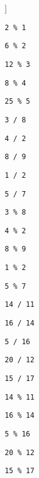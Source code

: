 \begin{exercise}
\begin{sltasks}[counter-format=1.tsk[1]]
\begin{items}
        \item \texttt{2 \% 1}
        \item \texttt{6 \% 2}
        \item \texttt{12 \% 3}
        \item \texttt{8 \% 4}
        \item \texttt{25 \% 5}
    \end{items}
    \task
    \begin{items}
        \item \texttt{3 / 8}
        \item \texttt{4 / 2}
        \item \texttt{8 / 9}
        \item \texttt{1 / 2}
        \item \texttt{5 / 7}
    \end{items}
    \task
    \begin{items}
        \item \texttt{3 \% 8}
        \item \texttt{4 \% 2}
        \item \texttt{8 \% 9}
        \item \texttt{1 \% 2}
        \item \texttt{5 \% 7}
    \end{items}
    \task
    \begin{items}
        \item \texttt{14 / 11}
        \item \texttt{16 / 14}
        \item \texttt{5 / 16}
        \item \texttt{20 / 12}
        \item \texttt{15 / 17}
    \end{items}
    \task
    \begin{items}
        \item \texttt{14 \% 11}
        \item \texttt{16 \% 14}
        \item \texttt{5 \% 16}
        \item \texttt{20 \% 12}
        \item \texttt{15 \% 17}
    \end{items}
\end{sltasks}
\end{exercise}

